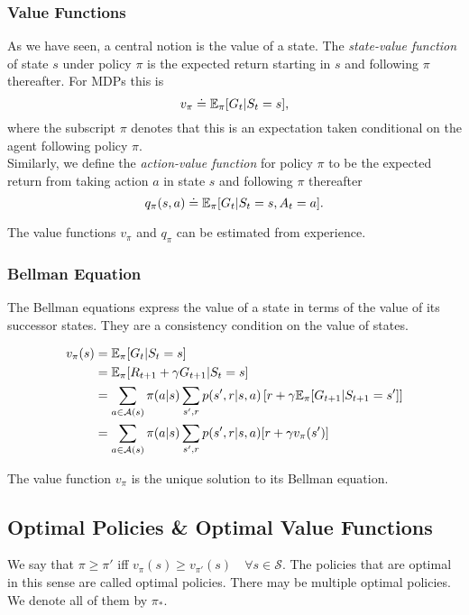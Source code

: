\subsubsection*{Value Functions}
As we have seen, a central notion is the value of a state. The \emph{state-value function} of state $s$ under policy $\pi$ is the expected return starting in $s$ and following $\pi$ thereafter. For MDPs this is
\begin{equation}
    v_\pi \doteq \mathbb{E}_{\pi}[G_t | S_t = s],
\end{equation}
where the subscript $\pi$ denotes that this is an expectation taken conditional on the agent following policy $\pi$. \\

Similarly, we define the \emph{action-value function} for policy $\pi$ to be the expected return from taking action $a$ in state $s$ and following $\pi$ thereafter
\begin{equation}
    q_\pi(s, a) \doteq \mathbb{E}_{\pi}[G_t | S_t = s, A_t = a].
\end{equation}

The value functions $v_\pi$ and $q_\pi$ can be estimated from experience.\\

\subsubsection*{Bellman Equation}

The Bellman equations express the value of a state in terms of the value of its successor states. They are a consistency condition on the value of states. 

\begin{align}
    v_{\pi}(s) &= \mathbb{E}_{\pi}{}[G_t | S_t = s] \\
             &= \mathbb{E}_{\pi}{}[R_{t+1} + \gamma G_{t+1} | S_t = s] \\
             &= \sum_{a \in \mathcal{A}(s)} \pi(a|s) \sum_{s', r} p(s', r | s, a) \left[r + \gamma \mathbb{E}_{\pi}{}[G_{t+1} | S_{t+1} = s']\right] \\
             &=  \sum_{a \in \mathcal{A}(s)} \pi(a|s) \sum_{s', r} p(s', r | s, a) [r + \gamma v_{\pi}(s')]
\end{align} 
    

The value function $v_\pi$ is the unique solution to its Bellman equation.


\subsection{Optimal Policies \& Optimal Value Functions}
We say that $\pi \geq \pi'$ iff $v_\pi (s) \geq v_{\pi'}(s) \quad \forall s \in \mathcal{S}$. The policies that are optimal in this sense are called optimal policies. There may be multiple optimal policies. We denote all of them by $\pi_*$.\\

